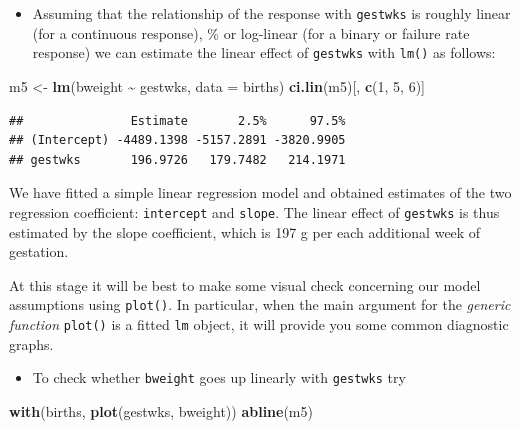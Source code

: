 \documentclass[
]{book}
\newenvironment{Shaded}{\begin{snugshade}}{\end{snugshade}}
\newcommand{\AttributeTok}[1]{\textcolor[rgb]{0.13,0.29,0.53}{#1}}
\newcommand{\DecValTok}[1]{\textcolor[rgb]{0.00,0.00,0.81}{#1}}
\newcommand{\FunctionTok}[1]{\textcolor[rgb]{0.13,0.29,0.53}{\textbf{#1}}}
\newcommand{\NormalTok}[1]{#1}
\newcommand{\OtherTok}[1]{\textcolor[rgb]{0.56,0.35,0.01}{#1}}
\newcommand{\SpecialCharTok}[1]{\textcolor[rgb]{0.81,0.36,0.00}{\textbf{#1}}}
\providecommand{\tightlist}{%
  \setlength{\itemsep}{0pt}\setlength{\parskip}{0pt}}
\begin{document}
\begin{itemize}
\tightlist
\item
  Assuming that the relationship
  of the response with \texttt{gestwks} is roughly linear
  (for a continuous response),
  \% or log-linear (for a binary or failure rate response)
  we can estimate the linear effect of \texttt{gestwks} with \texttt{lm()} as follows:
\end{itemize}

\begin{Shaded}
\begin{Highlighting}[]
\NormalTok{m5 }\OtherTok{\textless{}{-}} \FunctionTok{lm}\NormalTok{(bweight }\SpecialCharTok{\textasciitilde{}}\NormalTok{ gestwks, }\AttributeTok{data =}\NormalTok{ births)}
\FunctionTok{ci.lin}\NormalTok{(m5)[, }\FunctionTok{c}\NormalTok{(}\DecValTok{1}\NormalTok{, }\DecValTok{5}\NormalTok{, }\DecValTok{6}\NormalTok{)]}
\end{Highlighting}
\end{Shaded}

\begin{verbatim}
##               Estimate       2.5%      97.5%
## (Intercept) -4489.1398 -5157.2891 -3820.9905
## gestwks       196.9726   179.7482   214.1971
\end{verbatim}

We have fitted a simple linear regression model and
obtained estimates of the
two regression coefficient: \texttt{intercept} and \texttt{slope}.
The linear effect of \texttt{gestwks} is thus estimated by the
slope coefficient, which is 197 g per each additional week of gestation.

At this stage it will be best to make some visual check concerning
our model assumptions using \texttt{plot()}. In particular, when the main argument
for the \emph{generic function} \texttt{plot()} is a fitted \texttt{lm} object,
it will provide you some common diagnostic graphs.

\begin{itemize}
\tightlist
\item
  To check whether \texttt{bweight} goes up linearly with \texttt{gestwks} try
\end{itemize}

\begin{Shaded}
\begin{Highlighting}[]
\FunctionTok{with}\NormalTok{(births, }\FunctionTok{plot}\NormalTok{(gestwks, bweight))}
\FunctionTok{abline}\NormalTok{(m5)}
\end{Highlighting}
\end{Shaded}
\end{document}
